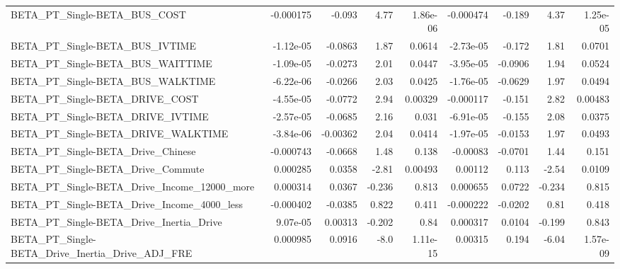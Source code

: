 \begin{tabular}{lrrrrrrrr}
BETA\_PT\_Single-BETA\_BUS\_COST                       &   -0.000175 &       -0.093 &     4.77 & 1.86e-06 &  -0.000474 &      -0.189 &         4.37 &      1.25e-05 \\
BETA\_PT\_Single-BETA\_BUS\_IVTIME                     &   -1.12e-05 &      -0.0863 &     1.87 &   0.0614 &  -2.73e-05 &      -0.172 &         1.81 &        0.0701 \\
BETA\_PT\_Single-BETA\_BUS\_WAITTIME                   &   -1.09e-05 &      -0.0273 &     2.01 &   0.0447 &  -3.95e-05 &     -0.0906 &         1.94 &        0.0524 \\
BETA\_PT\_Single-BETA\_BUS\_WALKTIME                   &   -6.22e-06 &      -0.0266 &     2.03 &   0.0425 &  -1.76e-05 &     -0.0629 &         1.97 &        0.0494 \\
BETA\_PT\_Single-BETA\_DRIVE\_COST                     &   -4.55e-05 &      -0.0772 &     2.94 &  0.00329 &  -0.000117 &      -0.151 &         2.82 &       0.00483 \\
BETA\_PT\_Single-BETA\_DRIVE\_IVTIME                   &   -2.57e-05 &      -0.0685 &     2.16 &    0.031 &  -6.91e-05 &      -0.155 &         2.08 &        0.0375 \\
BETA\_PT\_Single-BETA\_DRIVE\_WALKTIME                 &   -3.84e-06 &     -0.00362 &     2.04 &   0.0414 &  -1.97e-05 &     -0.0153 &         1.97 &        0.0493 \\
BETA\_PT\_Single-BETA\_Drive\_Chinese                  &   -0.000743 &      -0.0668 &     1.48 &    0.138 &   -0.00083 &     -0.0701 &         1.44 &         0.151 \\
BETA\_PT\_Single-BETA\_Drive\_Commute                  &    0.000285 &       0.0358 &    -2.81 &  0.00493 &    0.00112 &       0.113 &        -2.54 &        0.0109 \\
BETA\_PT\_Single-BETA\_Drive\_Income\_12000\_more        &    0.000314 &       0.0367 &   -0.236 &    0.813 &   0.000655 &      0.0722 &       -0.234 &         0.815 \\
BETA\_PT\_Single-BETA\_Drive\_Income\_4000\_less         &   -0.000402 &      -0.0385 &    0.822 &    0.411 &  -0.000222 &     -0.0202 &         0.81 &         0.418 \\
BETA\_PT\_Single-BETA\_Drive\_Inertia\_Drive            &    9.07e-05 &      0.00313 &   -0.202 &     0.84 &   0.000317 &      0.0104 &       -0.199 &         0.843 \\
BETA\_PT\_Single-BETA\_Drive\_Inertia\_Drive\_ADJ\_FRE    &    0.000985 &       0.0916 &     -8.0 & 1.11e-15 &    0.00315 &       0.194 &        -6.04 &      1.57e-09 \\

\end{tabular}

